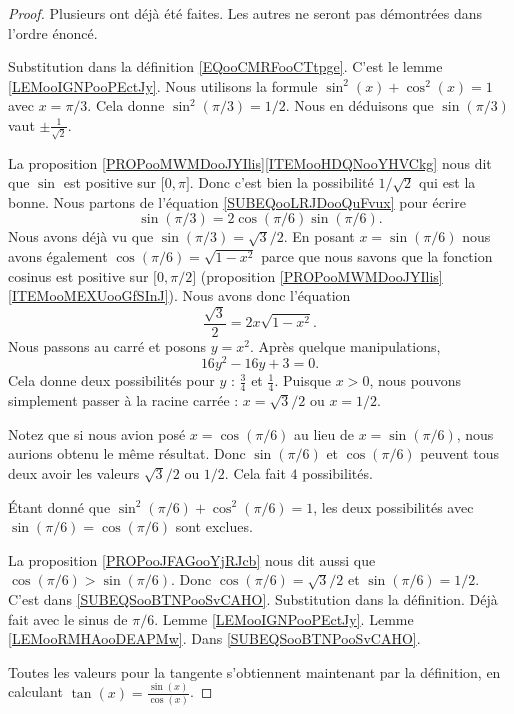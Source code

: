 \begin{proof}
	Plusieurs ont déjà été faites. Les autres ne seront pas démontrées dans l'ordre énoncé.
	\begin{subproof}
		\spitem[\( \sin(0)=0\)]
		Substitution dans la définition \eqref{EQooCMRFooCTtpge}.
		\spitem[\(  \sin(\pi/4)=\sqrt{ 2 }/2\)]
		C'est le lemme \ref{LEMooIGNPooPEctJy}.
		\spitem[\(  \sin(\pi/3)=1/\sqrt{ 2 }\)]
		Nous utilisons la formule \( \sin^2(x)+\cos^2(x)=1\) avec \( x=\pi/3\). Cela donne \( \sin^2(\pi/3)=1/2\). Nous en déduisons que \( \sin(\pi/3)\) vaut \( \pm\frac{1}{ \sqrt{ 2 } }\).

		La proposition \ref{PROPooMWMDooJYIlis}\ref{ITEMooHDQNooYHVCkg} nous dit que \( \sin\) est positive sur \(\mathopen[ 0 , \pi \mathclose]\). Donc c'est bien la possibilité \( 1/\sqrt{ 2 }\) qui est la bonne.
		\spitem[\( \sin(\pi/6)=1/2\) et \( \cos(\pi/6)=\sqrt{ 3 }/2 \)]
		Nous partons de l'équation \eqref{SUBEQooLRJDooQuFvux} pour écrire
		\begin{equation}
			\sin(\pi/3)=2\cos(\pi/6)\sin(\pi/6).
		\end{equation}
		Nous avons déjà vu que \( \sin(\pi/3)=\sqrt{ 3 }/2\). En posant \( x=\sin(\pi/6)\) nous avons également \( \cos(\pi/6)=\sqrt{ 1-x^2 }\) parce que nous savons que la fonction cosinus est positive sur \( \mathopen[ 0 , \pi/2 \mathclose]\) (proposition \ref{PROPooMWMDooJYIlis}\ref{ITEMooMEXUooGfSInJ}). Nous avons donc l'équation
		\begin{equation}
			\frac{ \sqrt{ 3 } }{2}=2x\sqrt{ 1-x^2 }.
		\end{equation}
		Nous passons au carré et posons \( y=x^2\). Après quelque manipulations,
		\begin{equation}
			16y^2-16y+3=0.
		\end{equation}
		Cela donne deux possibilités pour \( y\) : \( \frac{ 3 }{ 4 }\) et \( \frac{1}{ 4 }\). Puisque \( x>0\), nous pouvons simplement passer à la racine carrée : \( x=\sqrt{ 3 }/2\) ou \( x=1/2\).

		Notez que si nous avion posé \( x=\cos(\pi/6)\) au lieu de \( x=\sin(\pi/6)\), nous aurions obtenu le même résultat. Donc \( \sin(\pi/6)\) et \( \cos(\pi/6)\) peuvent tous deux avoir les valeurs \( \sqrt{ 3 }/2\) ou \( 1/2\). Cela fait \( 4\) possibilités.

		Étant donné que \( \sin^2(\pi/6)+\cos^2(\pi/6)=1\), les deux possibilités avec \( \sin(\pi/6)=\cos(\pi/6)\) sont exclues.

		La proposition \ref{PROPooJFAGooYjRJcb} nous dit aussi que \( \cos(\pi/6)>\sin(\pi/6)\). Donc \( \cos(\pi/6)=\sqrt{ 3 }/2\) et \( \sin(\pi/6)=1/2\).
		\spitem[\( \sin(\pi/2)=1 \)] C'est dans \eqref{SUBEQSooBTNPooSvCAHO}.
		\spitem[\( \cos(0)=1 \)] Substitution dans la définition.
		\spitem[\( \cos(\pi/6)=\sqrt{ 3 }/2 \)] Déjà fait avec le sinus de \( \pi/6\).
		\spitem[\( \cos(\pi/4)=\sqrt{ 2 }/2 \)]  Lemme \ref{LEMooIGNPooPEctJy}.
		\spitem[\( \cos(\pi/3)=1/2 \)] Lemme \ref{LEMooRMHAooDEAPMw}.
		\spitem[\( \cos(\pi/2)=0 \)] Dans \eqref{SUBEQSooBTNPooSvCAHO}.
	\end{subproof}
	Toutes les valeurs pour la tangente s'obtiennent maintenant par la définition, en calculant \( \tan(x)=\frac{ \sin(x) }{ \cos(x) }\).
\end{proof}

